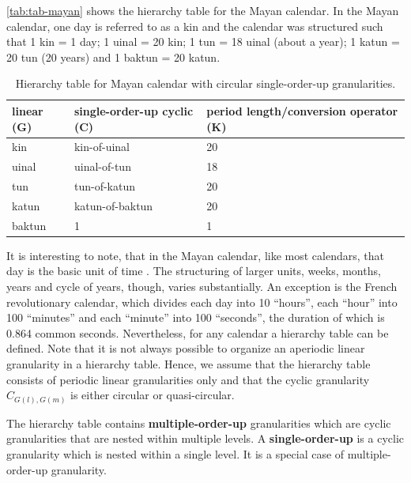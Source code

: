 \documentclass[12pt]{article}
\begin{document}
\begin{example}
{\rm  \autoref{tab:tab-mayan} shows the hierarchy table for the Mayan calendar. In the Mayan calendar, one day is referred to as a kin and the calendar was structured such that 1 kin = 1 day; 1 uinal = 20 kin; 1 tun  = 18 uinal (about a year); 1 katun = 20 tun (20 years) and 1 baktun = 20 katun. }
\end{example}

\begin{table}

\caption{\label{tab:tab-mayan}Hierarchy table for Mayan calendar with circular single-order-up granularities.}
\centering
\begin{tabular}[t]{lll}
\toprule
linear (G) & single-order-up cyclic (C) & period length/conversion operator (K)\\
\midrule
kin & kin-of-uinal & 20\\
uinal & uinal-of-tun & 18\\
tun & tun-of-katun & 20\\
katun & katun-of-baktun & 20\\
baktun & 1 & 1\\
\bottomrule
\end{tabular}
\end{table}

\noindent It is interesting to note, that in the Mayan calendar, like most calendars, that day is the basic unit of time \citep{Reingold2001-kf}. The structuring of larger units, weeks, months, years and cycle of years, though, varies substantially. An exception is the French revolutionary calendar, which divides each day into 10 ``hours'', each ``hour'' into 100 ``minutes'' and each ``minute'' into 100 ``seconds'', the duration of which is 0.864 common seconds. Nevertheless, for any calendar a hierarchy table can be defined. Note that it is not always possible to organize an aperiodic linear granularity in a hierarchy table. Hence, we assume that the hierarchy table consists of periodic linear granularities only and that the cyclic granularity \(C_{G(l),G(m)}\) is either circular or quasi-circular.

\begin{definition}\label{def:norderup} 
The hierarchy table contains {\bf multiple-order-up} granularities which are cyclic granularities that are nested within multiple levels.
A {\bf single-order-up} is a cyclic granularity which is nested within a single level. It is a special case of multiple-order-up granularity.
\end{definition}
\end{document}
